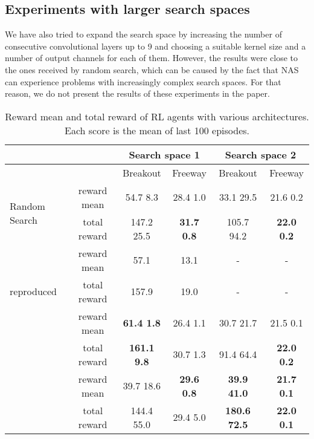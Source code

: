 \documentclass{svproc}
\begin{document}
\subsection{Experiments with larger search spaces}
We have also tried to expand the search space by increasing the number of consecutive convolutional layers up to 9 and choosing a suitable kernel size and a number of output channels for each of them. However, the results were close to the ones received by random search, which can be caused by the fact that NAS can experience problems with increasingly complex search spaces. For that reason, we do not present the results of these experiments in the paper. 



\begin{table}[t]
\centering 
 \caption{Reward mean and total reward of RL agents with various architectures. Each score is the mean of last 100 episodes.}
 \label{tbl:results_table}
\begin{tabularx}{\textwidth}{@{}lccccc@{}}
\toprule

            & & \multicolumn{2}{c}{Search space 1}  &  \multicolumn{2}{c}{Search space 2} \\ 
\midrule

            & & Breakout & Freeway & Breakout & Freeway \\ 
\midrule


\multirow{2}{*}{Random Search}      & reward mean     & 54.7  8.3    & 28.4  1.0  & 33.1  29.5   & 21.6  0.2  \\ 
                                    & total reward    & 147.2  25.5  & \textbf{31.7  0.8}  & 105.7  94.2    & \textbf{22.0  0.2}  \\ 
\addlinespace

 \multirow{1}{*}{Nature-CNN \cite{Humanlevel2015},} & reward mean               & 57.1          & 13.1      & -         & -     \\ 
 \quad reproduced                                   & total reward              & 157.9         & 19.0      & -         & -     \\ 


\addlinespace

\multirow{2}{*}{ENAS}   & reward mean             & \textbf{61.4  1.8}          & 26.4  1.1  & 30.7  21.7      & 21.5  0.1                     \\
                        & total reward             & \textbf{161.1  9.8}    & 30.7  1.3    & 91.4   64.4   & \textbf{22.0  0.2}                     \\ 
\addlinespace

\multirow{2}{*}{SPOS}   & reward mean               & 39.7  18.6         & \textbf{29.6  0.8}    & \textbf{39.9  41.0}     & \textbf{21.7  0.1}     \\ 
                        & total reward              & 144.4  55.0         & 29.4  5.0             & \textbf{180.6  72.5}    & \textbf{22.0  0.1}              \\ 

\bottomrule
\end{tabularx}
\end{table}
\end{document}
